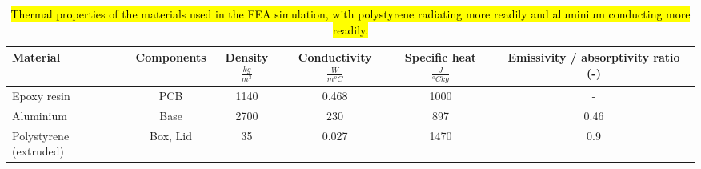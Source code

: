 
\begin{center}
\begin{table}[ht]
\centering
\begin{adjustbox}{max width=\textwidth}
  \begin{tabular}{ | l | c | c | c | c | c | }
    \hline
    \textbf{Material} & \textbf{Components} & \textbf{Density $ \frac{kg}{m^3} $ } & \textbf{Conductivity $ \frac{W}{m ^oC} $} &\textbf{Specific heat $ \frac{J}{^oC kg} $} & \textbf{Emissivity / absorptivity  ratio (-)} \\ \hline
    Epoxy resin  & PCB & 1140 & 0.468 & 1000 & -\\ \hline
    Aluminium & Base & 2700 & 230 & 897 & 0.46\\ \hline
    Polystyrene (extruded)  & Box, Lid & 35 & 0.027 & 1470 & 0.9\\ \hline
  \end{tabular}
\end{adjustbox}
\caption{\hl{Thermal properties of the materials used in the FEA simulation, with polystyrene radiating more readily and aluminium conducting more readily.}}
\end{table}
\label{tab: thermal materials}
\end{center}